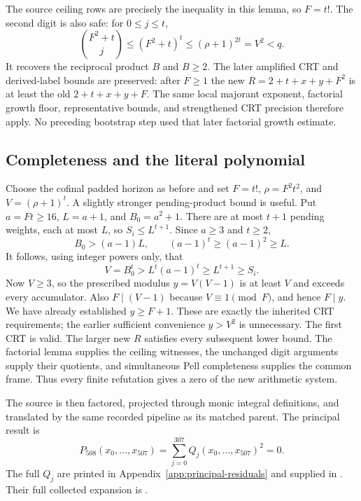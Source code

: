 The source ceiling rows are precisely the inequality in this lemma, so
$F=t!$. The second digit is also safe: for $0\le j\le t$,
\[
 \binom{F^2+t}{j}\le(F^2+t)^t\le(\rho+1)^{2t}=V^2<q.
\]
It recovers the reciprocal product $B$ and $B\ge2$. The later amplified
CRT and derived-label bounds are preserved: after $F\ge1$ the new
$R=2+t+x+y+F^2$ is at least the old $2+t+x+y+F$. The same local
majorant exponent, factorial growth floor, representative bounds, and
strengthened CRT precision therefore apply. No preceding bootstrap step
used that later factorial growth estimate.

\subsection{Completeness and the literal polynomial}
Choose the cofinal padded horizon as before and set $F=t!$,
$\rho=F^2t^2$, and $V=(\rho+1)^t$. A slightly stronger pending-product
bound is useful. Put $a=Ft\ge16$, $L=a+1$, and $B_0=a^2+1$.
There are at most $t+1$ pending weights, each at most $L$, so
$S_i\le L^{t+1}$. Since $a\ge3$ and $t\ge2$,
\[
 B_0>(a-1)L,\qquad (a-1)^t\ge(a-1)^2\ge L.
\]
It follows, using integer powers only, that
\[
 V=B_0^t>L^t(a-1)^t\ge L^{t+1}\ge S_i.
\]
Now $V\ge3$, so the prescribed modulus $y=V(V-1)$ is at least $V$
and exceeds every accumulator. Also $F\mid(V-1)$ because
$V\equiv1\pmod F$, and hence $F\mid y$. We have already established
$y\ge F+1$. These are exactly the inherited CRT requirements; the earlier
sufficient convenience $y>V^2$ is unnecessary. The first CRT is valid. The larger new
$R$ satisfies every subsequent lower bound. The factorial lemma supplies
the ceiling witnesses, the unchanged digit arguments supply their quotients,
and simultaneous Pell completeness supplies the common frame. Thus every
finite refutation gives a zero of the new arithmetic system.

The source is then factored, projected through monic integral definitions,
and translated by the same recorded pipeline as its matched parent. The
principal result is
\[
 \boxed{P_{508}(x_0,\ldots,x_{507})
       =\sum_{j=0}^{307}Q_j(x_0,\ldots,x_{507})^2=0.}
 \tag{15}\label{eq:P508}
\]
The full $Q_j$ are printed in Appendix~\ref{app:principal-residuals} and supplied in
. Their full collected expansion is
.

